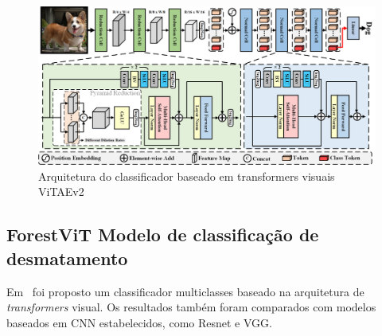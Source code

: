 \begin{figure}[!ht]
    \centering
    \includegraphics[width=\columnwidth]{
        Imagens/ViTAEv2.png
    }
    \caption{
Arquitetura do classificador baseado em transformers visuais ViTAEv2 ~\cite{wang2022empirical}
        }
    \label{fig:ViTAEv2}
\end{figure}



\subsection{ForestViT Modelo de classificação de desmatamento}\label{sec:Cap2_ForestViT}

Em~\cite{9701667} foi proposto um classificador multiclasses baseado na arquitetura de \textit{transformers} visual. Os resultados também foram comparados com modelos baseados em CNN estabelecidos, como Resnet e VGG. 





